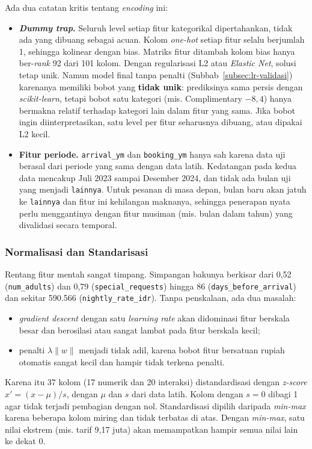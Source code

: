 Ada dua catatan kritis tentang \textit{encoding} ini:
\begin{itemize}
	\item \textbf{\textit{Dummy trap}.} Seluruh level setiap fitur kategorikal dipertahankan, tidak ada yang dibuang sebagai acuan. Kolom \textit{one-hot} setiap fitur selalu berjumlah 1, sehingga kolinear dengan bias. Matriks fitur ditambah kolom bias hanya ber-\textit{rank} 92 dari 101 kolom. Dengan regularisasi L2 atau \textit{Elastic Net}, solusi tetap unik. Namun model final tanpa penalti (Subbab~\ref{subsec:lr-validasi}) karenanya memiliki bobot yang \textbf{tidak unik}: prediksinya sama persis dengan \textit{scikit-learn}, tetapi bobot satu kategori (mis. Complimentary $-8{,}4$) hanya bermakna relatif terhadap kategori lain dalam fitur yang sama. Jika bobot ingin diinterpretasikan, satu level per fitur seharusnya dibuang, atau dipakai L2 kecil.
	\item \textbf{Fitur periode.} \texttt{arrival\_ym} dan \texttt{booking\_ym} hanya sah karena data uji berasal dari periode yang sama dengan data latih. Kedatangan pada kedua data mencakup Juli 2023 sampai Desember 2024, dan tidak ada bulan uji yang menjadi \texttt{lainnya}. Untuk pesanan di masa depan, bulan baru akan jatuh ke \texttt{lainnya} dan fitur ini kehilangan maknanya, sehingga penerapan nyata perlu menggantinya dengan fitur musiman (mis. bulan dalam tahun) yang divalidasi secara temporal.
\end{itemize}

\subsubsection{Normalisasi dan Standarisasi}
Rentang fitur mentah sangat timpang. Simpangan bakunya berkisar dari 0,52 (\texttt{num\_adults}) dan 0,79 (\texttt{special\_requests}) hingga 86 (\texttt{days\_before\_arrival}) dan sekitar 590.566 (\texttt{nightly\_rate\_idr}). Tanpa penskalaan, ada dua masalah:
\begin{itemize}
	\item \textit{gradient descent} dengan satu \textit{learning rate} akan didominasi fitur berskala besar dan berosilasi atau sangat lambat pada fitur berskala kecil;
	\item penalti $\lambda\lVert w\rVert$ menjadi tidak adil, karena bobot fitur bersatuan rupiah otomatis sangat kecil dan hampir tidak terkena penalti.
\end{itemize}
Karena itu 37 kolom (17 numerik dan 20 interaksi) distandardisasi dengan \textit{z-score} $x' = (x - \mu)/s$, dengan $\mu$ dan $s$ dari data latih. Kolom dengan $s = 0$ dibagi 1 agar tidak terjadi pembagian dengan nol. Standardisasi dipilih daripada \textit{min-max} karena beberapa kolom miring dan tidak terbatas di atas. Dengan \textit{min-max}, satu nilai ekstrem (mis. tarif 9,17 juta) akan memampatkan hampir semua nilai lain ke dekat 0.


